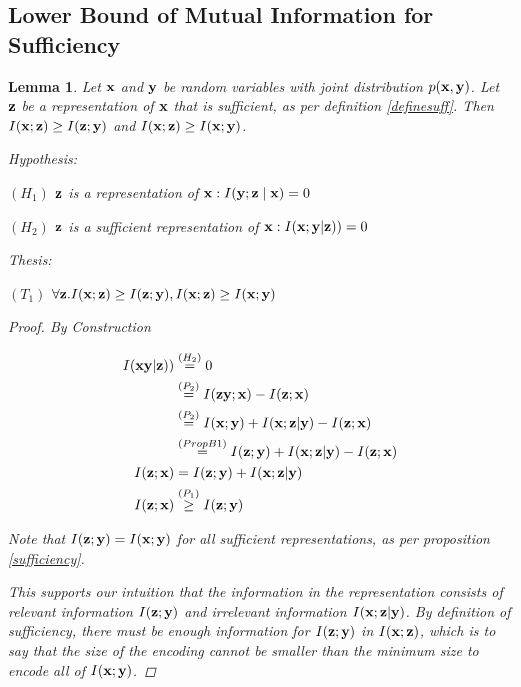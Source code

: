 \documentclass[letterpaper]{article} %
\theoremstyle{plain}
\newtheorem{lemma}[theorem]{Lemma}
\theoremstyle{definition}
\theoremstyle{remark}
\begin{document}
\subsection{Lower Bound of Mutual Information for Sufficiency}
\begin{lemma}
    Let ${\mathbf{x}}$ and ${\mathbf{y}}$ be random variables with joint distribution $p({\mathbf{x}}, {\mathbf{y}})$. Let ${\mathbf{z}}$ be a representation of ${\mathbf{x}}$ that is sufficient, as per definition \ref{definesuff}. Then $I({\mathbf{x}};{\mathbf{z}}) \geq I({\mathbf{z}};{\mathbf{y}})$ and $I({\mathbf{x}};{\mathbf{z}}) \geq I({\mathbf{x}};{\mathbf{y}})$. 

    Hypothesis: 

    $(H_1)$ ${\mathbf{z}}$ is a representation of ${\mathbf{x}}: I({\mathbf{y}} ; {\mathbf{z}} \mid {\mathbf{x}})=0$
    
    $(H_2)$ $ {\mathbf{z}}$ is a sufficient representation of ${\mathbf{x}}: I({\mathbf{x}}; {\mathbf{y}}| {\mathbf{z}}))=0$
    
    Thesis: 
    
    $(T_1)$ $\forall {\mathbf{z}}.I({\mathbf{x}};{\mathbf{z}}) \geq I({\mathbf{z}};{\mathbf{y}}), I({\mathbf{x}};{\mathbf{z}}) \geq I({\mathbf{x}};{\mathbf{y}})$

    \begin{proof}By Construction 

    $$
    \begin{aligned}
    I({\mathbf{x}} {\mathbf{y}}|{\mathbf{z}})) &\stackrel{\left(H_2\right)}{=} 0 \\
    &\stackrel{\left(P_2\right)}{=} I({\mathbf{z}} {\mathbf{y}}; {\mathbf{x}}) - I({\mathbf{z}}; {\mathbf{x}}) \\
    &\stackrel{\left(P_2\right)}{=} I({\mathbf{x}}; {\mathbf{y}}) + I({\mathbf{x}}; {\mathbf{z}}|{\mathbf{y}}) - I({\mathbf{z}}; {\mathbf{x}}) \\
    &\stackrel{\left(PropB1\right)}{=} I({\mathbf{z}}; {\mathbf{y}}) + I({\mathbf{x}}; {\mathbf{z}}|{\mathbf{y}}) - I({\mathbf{z}};{\mathbf{x}}) \\
    I({\mathbf{z}};{\mathbf{x}}) &= I({\mathbf{z}};{\mathbf{y}}) + I({\mathbf{x}}; {\mathbf{z}}|{\mathbf{y}})\\
   I({\mathbf{z}};{\mathbf{x}}) &\stackrel{\left(P_1\right)}{\geq} I({\mathbf{z}}; {\mathbf{y}})\\
    \end{aligned}
    $$

    Note that $I({\mathbf{z}}; {\mathbf{y}}) = I({\mathbf{x}}; {\mathbf{y}})$ for all sufficient representations, as per proposition \ref{sufficiency}.

    This supports our intuition that the information in the representation consists of relevant information $I({\mathbf{z}};{\mathbf{y}})$ and irrelevant information $I({\mathbf{x}}; {\mathbf{z}}| {\mathbf{y}})$. By definition of sufficiency, there must be enough information for $I({\mathbf{z}}; {\mathbf{y}})$ in $I({\mathbf{x}}; {\mathbf{z}})$, which is to say that the size of the encoding cannot be smaller than the minimum size to encode all of $I({\mathbf{x}}; {\mathbf{y}})$. 
    
    \end{proof} 
    \label{infobound}
\end{lemma}
\end{document}
